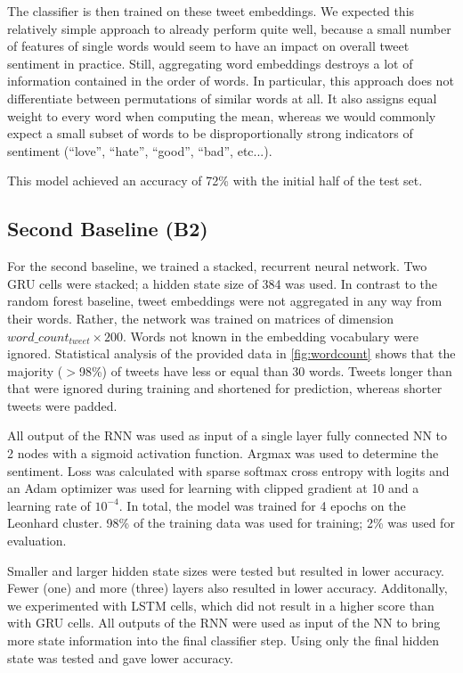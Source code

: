 \documentclass[10pt,conference,compsocconf]{IEEEtran}
\begin{document}
The classifier is then trained on these tweet embeddings. We expected
this relatively simple approach to already perform quite well, because
a small number of features of single words would seem to have an
impact on overall tweet sentiment in practice. Still, aggregating word
embeddings destroys a lot of information contained in the order of
words. In particular, this approach does not differentiate between
permutations of similar words at all. It also assigns equal weight to
every word when computing the mean, whereas we would commonly expect a
small subset of words to be disproportionally strong indicators of
sentiment (``love'', ``hate'', ``good'', ``bad'', etc...).

This model achieved an accuracy of 72\% with the initial half of the test set.

\subsection{Second Baseline (B2)} \label{subsec:b2}

For the second baseline, we trained a stacked, recurrent neural
network. Two GRU cells were stacked; a hidden state size of 384 was used.
In contrast to the random forest baseline, tweet embeddings
were not aggregated in any way from their words. Rather, the network
was trained on matrices of dimension \(word\_count_{tweet} \times 200\).
Words not known in the embedding vocabulary were ignored.
Statistical analysis of the provided data in \autoref{fig:wordcount} shows that
the majority ($>$98\%) of tweets have less or equal than 30 words.
Tweets longer than that were ignored during training and shortened for prediction,
whereas shorter tweets were padded.

All output of the RNN was used as input of a single layer fully connected NN
to 2 nodes with a sigmoid activation function.
Argmax was used to determine the sentiment.
Loss was calculated with sparse softmax cross entropy with logits and
an Adam optimizer was used for learning with clipped gradient at 10
and a learning rate of $10^{-4}$.
In total, the model was trained for 4 epochs on the Leonhard cluster.
98\% of the training data was used for training; 2\% was used for evaluation.

Smaller and larger hidden state sizes were tested but resulted in
lower accuracy. Fewer (one) and more (three) layers also resulted in lower accuracy.
Additonally, we experimented with LSTM cells, which did not result in
a higher score than with GRU cells.
All outputs of the RNN were used as input of the NN to bring more state
information into the final classifier step. Using only the final hidden
state was tested and gave lower accuracy.
\end{document}
